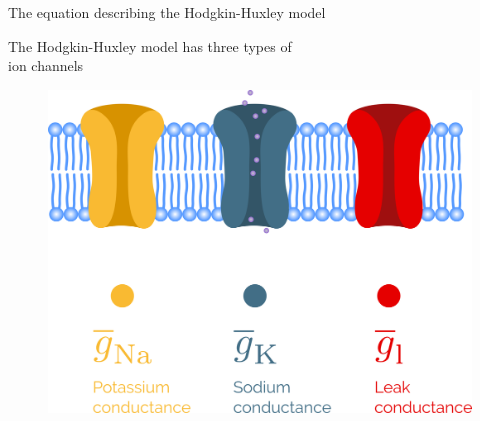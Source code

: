 \documentclass[presentation]{beamer}
\begin{document}
\begin{frame}{The equation describing the Hodgkin-Huxley model}

\vspace{-7mm}



\end{frame}



\begin{frame}{The Hodgkin-Huxley model has three types of \\ion channels}
  \vspace{-5mm}
  \begin{figure}
    \includegraphics[height=0.82\textheight]{deterministic_channels.png}
  \end{figure}
\end{frame}
\end{document}

